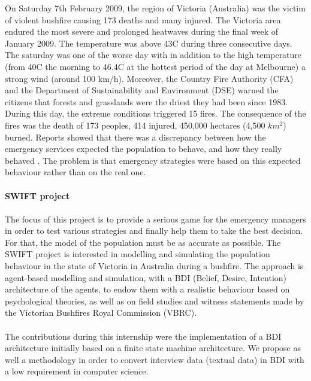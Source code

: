 \documentclass[12pt, a4paper]{memoir} %
\begin{document}
  On Saturday 7th February 2009, the region of Victoria (Australia) was the victim of violent bushfire causing 173 deaths and many injured.
	The Victoria area endured the most severe and prolonged heatwaves during the final week of January 2009. The temperature was above 43\degree C during three consecutive days.
	The saturday was one of the worse day with in addition to the high temperature (from 40\degree C the morning to 46.4\degree C at the hottest period of the day at Melbourne) a strong wind (around 100 km/h).
	Moreover, the Country Fire Authority (CFA) and the Department of Sustainability and Environment (DSE) warned the citizens that forests and grasslands were the driest they had been since 1983.
	During this day, the extreme conditions triggered 15 fires. The consequence of the fires was the death of 173 peoples, 414 injured, 450,000 hectares (4,500 \begin{math}km^{2}\end{math}) burned.
  Reports showed that there was a discrepancy between how the emergency services expected the population to behave, and how they really behaved \cite{rhodes2014}.
  The problem is that emergency strategies were based on this expected behaviour rather than on the real one.

	\paragraph{}
	\textbf{SWIFT project}
	\paragraph{}

	The focus of this project is to provide a serious game for the emergency managers in order to test various strategies and finally help them to take the best decision.
	For that, the model of the population must be as accurate as possible. The SWIFT project is interested in modelling and simulating the population behaviour in the state of Victoria in Australia during a bushfire.
	The approach is agent-based modelling and simulation, with a BDI (Belief, Desire, Intention) architecture of the agents, to endow them with a
	realistic behaviour based on psychological theories, as well as on field studies and witness statements made by the Victorian Bushfires Royal Commission (VBRC).

	\paragraph{}
	The contributions during this internship were the implementation of a BDI architecture initially based on a finite state machine architecture. We propose as well a
	methodology in order to convert interview data (textual data) in BDI with a low requirement in computer science.
\end{document}
